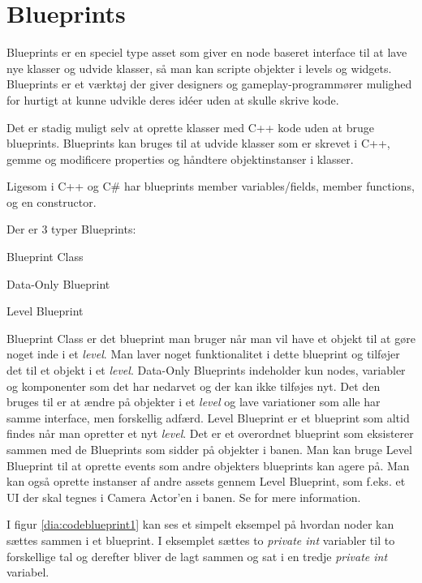 \section{Blueprints}
Blueprints er en speciel type asset som giver en node baseret interface til at lave nye klasser og udvide klasser, så man kan scripte objekter i levels og widgets. Blueprints er et værktøj der giver designers og gameplay-programmører mulighed for hurtigt at kunne udvikle deres idéer uden at skulle skrive kode.

Det er stadig muligt selv at oprette klasser med C++ kode uden at bruge blueprints. Blueprints kan bruges til at udvide klasser som er skrevet i C++, gemme og modificere properties og håndtere objektinstanser i klasser.

Ligesom i C++ og C\# har blueprints member variables/fields, member functions, og en constructor.

\begin{list}{}{}
\item[Der er 3 typer Blueprints:]
\item[Blueprint Class]
\item[Data-Only Blueprint]
\item[Level Blueprint]
\end{list}

Blueprint Class er det blueprint man bruger når man vil have et objekt til at gøre noget inde i et \textit{level}. Man laver noget funktionalitet i dette blueprint og tilføjer det til et objekt i et \textit{level}. Data-Only Blueprints indeholder kun nodes, variabler og komponenter som det har nedarvet og der kan ikke tilføjes nyt. Det den bruges til er at ændre på objekter i et \textit{level} og lave variationer som alle har samme interface, men forskellig adfærd. Level Blueprint er et blueprint som altid findes når man opretter et nyt \textit{level}. Det er et overordnet blueprint som eksisterer sammen med de Blueprints som sidder på objekter i banen. Man kan bruge Level Blueprint til at oprette events som andre objekters blueprints kan agere på. Man kan også oprette instanser af andre assets gennem Level Blueprint, som f.eks. et UI der skal tegnes i Camera Actor'en i banen. Se \cite{blueprint} for mere information.

I figur \ref{dia:codeblueprint1} kan ses et simpelt eksempel på hvordan noder kan sættes sammen i et blueprint. I eksemplet sættes to \textit{private int} variabler til to forskellige tal og derefter bliver de lagt sammen og sat i en tredje \textit{private int} variabel.


